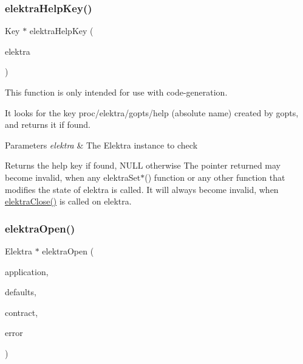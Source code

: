 \subsubsection{\texorpdfstring{elektra\+Help\+Key()}{elektraHelpKey()}}
{\footnotesize\ttfamily Key $\ast$ elektra\+Help\+Key (\begin{DoxyParamCaption}\item[{Elektra $\ast$}]{elektra }\end{DoxyParamCaption})}



This function is only intended for use with code-\/generation. 

It looks for the key proc/elektra/gopts/help (absolute name) created by gopts, and returns it if found.


\begin{DoxyParams}{Parameters}
{\em elektra} & The Elektra instance to check\\
\hline
\end{DoxyParams}
\begin{DoxyReturn}{Returns}
the help key if found, N\+U\+LL otherwise The pointer returned may become invalid, when any {\ttfamily elektra\+Set$\ast$()} function or any other function that modifies the state of {\ttfamily elektra} is called. It will always become invalid, when \hyperlink{group__highlevel_ga9b688b7250e5f9d8ea6701cc2cc269af}{elektra\+Close()} is called on {\ttfamily elektra}. 
\end{DoxyReturn}
\mbox{\label{group__highlevel_ga45de58b05c7a8ab02f6c54ddd31a56e1}} 
\subsubsection{\texorpdfstring{elektra\+Open()}{elektraOpen()}}
{\footnotesize\ttfamily Elektra $\ast$ elektra\+Open (\begin{DoxyParamCaption}\item[{const char $\ast$}]{application,  }\item[{Key\+Set $\ast$}]{defaults,  }\item[{Key\+Set $\ast$}]{contract,  }\item[{Elektra\+Error $\ast$$\ast$}]{error }\end{DoxyParamCaption})}



